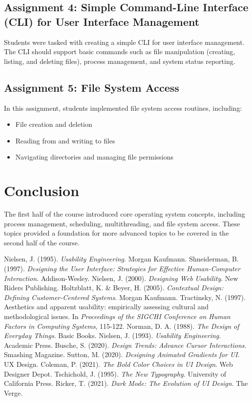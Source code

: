 \documentclass[12pt]{article}
\begin{document}
\subsection{Assignment 4: Simple Command-Line Interface (CLI) for User Interface Management}
Students were tasked with creating a simple CLI for user interface management. The CLI should support basic commands such as file manipulation (creating, listing, and deleting files), process management, and system status reporting.

\subsection{Assignment 5: File System Access}
In this assignment, students implemented file system access routines, including:
\begin{itemize}
    \item File creation and deletion
    \item Reading from and writing to files
    \item Navigating directories and managing file permissions
\end{itemize}

\section{Conclusion}
The first half of the course introduced core operating system concepts, including process management, scheduling, multithreading, and file system access. These topics provided a foundation for more advanced topics to be covered in the second half of the course.


\newpage

\begin{thebibliography}{9}
    Nielsen, J. (1995). \textit{Usability Engineering}. Morgan Kaufmann.
    Shneiderman, B. (1997). \textit{Designing the User Interface: Strategies for Effective Human-Computer Interaction}. Addison-Wesley.
    Nielsen, J. (2000). \textit{Designing Web Usability}. New Riders Publishing.
    Holtzblatt, K. \& Beyer, H. (2005). \textit{Contextual Design: Defining Customer-Centered Systems}. Morgan Kaufmann.
    Tractinsky, N. (1997). Aesthetics and apparent usability: empirically assessing cultural and methodological issues. In \textit{Proceedings of the SIGCHI Conference on Human Factors in Computing Systems}, 115-122.
    Norman, D. A. (1988). \textit{The Design of Everyday Things}. Basic Books.
    Nielsen, J. (1993). \textit{Usability Engineering}. Academic Press.
    Busche, S. (2020). \textit{Design Trends: Advance Cursor Interactions}. Smashing Magazine.
    Sutton, M. (2020). \textit{Designing Animated Gradients for UI}. UX Design.
    Coleman, P. (2021). \textit{The Bold Color Choices in UI Design}. Web Designer Depot.
    Tschichold, J. (1995). \textit{The New Typography}. University of California Press.
    Ricker, T. (2021). \textit{Dark Mode: The Evolution of UI Design}. The Verge.
\end{thebibliography}
\end{document}
